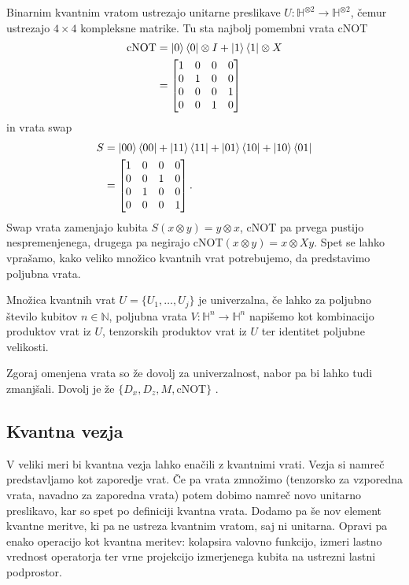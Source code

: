 \documentclass[mat1]{fmfdelo}
\newcommand{\N}{\mathbb N}
\newcommand{\Hb}{\mathbb H}
\begin{document}
Binarnim kvantnim vratom ustrezajo unitarne preslikave \(U:\Hb^{\otimes 2}\to \Hb^{\otimes 2}\), čemur ustrezajo \(4\times 4\) kompleksne matrike. Tu sta najbolj pomembni vrata cNOT 
\begin{align*}
    \text{cNOT}&=\ket0\bra0\otimes I + \ket1\bra1\otimes X \\
    &=\begin{bmatrix}
        1&0&0&0\\
        0&1&0&0\\
        0&0&0&1\\
        0&0&1&0
    \end{bmatrix}
\end{align*}
in vrata swap
\begin{align*}
    S &= \ket{00}\bra{00}+\ket{11}\bra{11}+\ket{01}\bra{10}+\ket{10}\bra{01}\\
    &=\begin{bmatrix}
        1&0&0&0\\
        0&0&1&0\\
        0&1&0&0\\
        0&0&0&1
    \end{bmatrix}.
\end{align*}
Swap vrata zamenjajo kubita \(S(x\otimes y)=y\otimes x\), cNOT pa prvega pustijo nespremenjenega, drugega pa negirajo cNOT\((x\otimes y)=x\otimes Xy\). Spet se lahko vprašamo, kako veliko množico kvantnih vrat potrebujemo, da predstavimo poljubna vrata.
\begin{definicija}
    Množica kvantnih vrat \(U=\{U_1,\ldots,U_j\}\) je univerzalna, če lahko za poljubno število kubitov \(n\in\N\), poljubna vrata \(V:\Hb^n\to \Hb^n\) napišemo kot kombinacijo produktov vrat iz \(U\), tenzorskih produktov vrat iz \(U\) ter identitet poljubne velikosti.
\end{definicija}
Zgoraj omenjena vrata so že dovolj za univerzalnost, nabor pa bi lahko tudi zmanjšali. Dovolj je že \(\{D_x,D_z, M, \)cNOT\(\}\) \cite[Lema 5.26]{mathforqm}.
\subsection{Kvantna vezja}
V veliki meri bi kvantna vezja lahko enačili z kvantnimi vrati. Vezja si namreč predstavljamo kot zaporedje vrat. Če pa vrata zmnožimo (tenzorsko za vzporedna vrata, navadno za zaporedna vrata) potem dobimo namreč novo unitarno preslikavo, kar so spet po definiciji kvantna vrata. Dodamo pa še nov element kvantne meritve, ki pa ne ustreza kvantnim vratom, saj ni unitarna. Opravi pa enako operacijo kot kvantna meritev: kolapsira valovno funkcijo, izmeri lastno vrednost operatorja ter vrne projekcijo izmerjenega kubita na ustrezni lastni podprostor.
\end{document}
